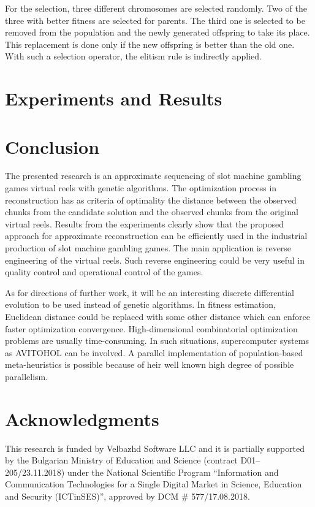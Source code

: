 \documentclass[11pt]{article}
\begin{document}
For the selection, three different chromosomes are selected randomly. Two of the three with better fitness are selected for parents. The third one is selected to be removed from the population and the newly generated offspring to take its place. This replacement is done only if the new offspring is better than the old one. With such a selection operator, the elitism rule is indirectly applied.

\section{Experiments and Results}

\section{Conclusion}

The presented research is an approximate sequencing of slot machine gambling games virtual reels with genetic algorithms. The optimization process in reconstruction has as criteria of optimality the distance between the observed chunks from the candidate solution and the observed chunks from the original virtual reels. Results from the experiments clearly show that the proposed approach for approximate reconstruction can be efficiently used in the industrial production of slot machine gambling games. The main application is reverse engineering of the virtual reels. Such reverse engineering could be very useful in quality control and operational control of the games. 

As for directions of further work, it will be an interesting discrete differential evolution to be used instead of genetic algorithms. In fitness estimation, Euclidean distance could be replaced with some other distance which can enforce faster optimization convergence. High-dimensional combinatorial optimization problems are usually time-consuming. In such situations, supercomputer systems as AVITOHOL \cite{Tashev-Tasheva-Petrov-2019} can be involved. A parallel implementation of population-based meta-heuristics is possible because of heir well known high degree of possible parallelism.

\section*{Acknowledgments}

This research is funded by Velbazhd Software LLC and it is partially supported by the Bulgarian Ministry of Education and Science (contract D01–205/23.11.2018) under the National Scientific Program ``Information and Communication Technologies for a Single Digital Market in Science, Education and Security (ICTinSES)'', approved by DCM \# 577/17.08.2018.
\end{document}
